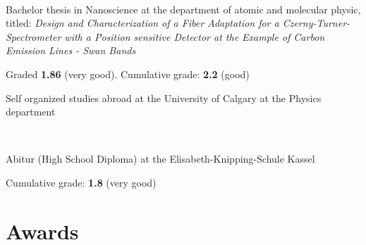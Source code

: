 \begin{adjustwidth}{2.5cm}{1.9cm}
\sectionsep

\\
\begin{tightemize} \vspace{-3pt}
\item Bachelor thesis in Nanoscience at the department of atomic and molecular physic, titled: \textit{Design and Characterization of a Fiber Adaptation for a Czerny-Turner-Spectrometer with a Position sensitive Detector at the Example of Carbon Emission Lines - Swan Bands }

Graded \textbf{1.86} (very good). Cumulative grade: \textbf{2.2} (good)
\end{tightemize}

\begin{tightemize} \vspace{-3pt}
\item Self organized studies abroad at the University of Calgary at the Physics department
\end{tightemize}
\sectionsep

\\
\begin{tightemize} \vspace{-3pt}
\item Abitur (High School Diploma) at the Elisabeth-Knipping-Schule Kassel 

Cumulative grade: \textbf{1.8} (very good)
\end{tightemize}


\sectionsep
\vspace{0.5mm}
\section{Awards}


\end{adjustwidth}
